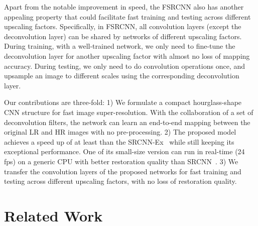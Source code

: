 \documentclass[runningheads]{llncs}
\begin{document}
Apart from the notable improvement in speed, the FSRCNN also has another appealing property that could facilitate fast training and testing across different upscaling factors. Specifically, in FSRCNN, all convolution layers (except the deconvolution layer) can be shared by networks of different upscaling factors. During training, with a well-trained network, we only need to fine-tune the deconvolution layer for another upscaling factor with almost no loss of mapping accuracy. During testing, we only need to do convolution operations once, and upsample an image to different scales using the corresponding deconvolution layer.

Our contributions are three-fold: 1) We formulate a compact hourglass-shape CNN structure for fast image super-resolution. With the collaboration of a set of deconvolution filters, the network can learn an end-to-end mapping between the original LR and HR images with no pre-processing.
2) The proposed model achieves a speed up of at least  than the SRCNN-Ex~\cite{Dong2015} while still keeping its exceptional performance. One of its small-size version can run in real-time (24 fps) on a generic CPU with better restoration quality than SRCNN~\cite{Dong2014}.
3) We transfer the convolution layers of the proposed networks for fast training and testing across different upscaling factors, with no loss of restoration quality.

\section{Related Work}
\end{document}
